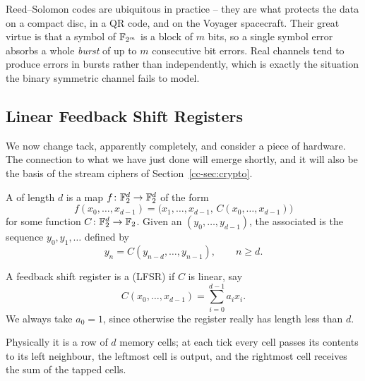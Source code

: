 \documentclass[a4paper]{scrartcl}
\begin{document}
\begin{remark}
	Reed--Solomon codes are ubiquitous in practice -- they are what protects the data on a compact disc, in a QR code, and on the Voyager spacecraft. Their great virtue is that a symbol of $\mathbb{F}_{2^m}$ is a block of $m$ bits, so a single symbol error absorbs a whole \emph{burst} of up to $m$ consecutive bit errors. Real channels tend to produce errors in bursts rather than independently, which is exactly the situation the binary symmetric channel fails to model.
\end{remark}

\subsection{Linear Feedback Shift Registers}

We now change tack, apparently completely, and consider a piece of hardware. The connection to what we have just done will emerge shortly, and it will also be the basis of the stream ciphers of Section~\ref{cc-sec:crypto}.

\begin{definition}
	A  of length $d$ is a map $f\colon\mathbb{F}_2^d\to\mathbb{F}_2^d$ of the form
	$$f(x_0,\dots,x_{d-1}) = \bigl(x_1,\dots,x_{d-1},\,C(x_0,\dots,x_{d-1})\bigr)$$
	for some function $C\colon\mathbb{F}_2^d\to\mathbb{F}_2$. Given an  $(y_0,\dots,y_{d-1})$, the associated  is the sequence $y_0,y_1,\dots$ defined by
	$$y_n = C(y_{n-d},\dots,y_{n-1}), \qquad n \ge d.$$
\end{definition}

\begin{definition}[LFSR]
	A feedback shift register is a  (LFSR) if $C$ is linear, say
	$$C(x_0,\dots,x_{d-1}) = \sum_{i=0}^{d-1}a_ix_i.$$
	We always take $a_0 = 1$, since otherwise the register really has length less than $d$.
\end{definition}

Physically it is a row of $d$ memory cells; at each tick every cell passes its contents to its left neighbour, the leftmost cell is output, and the rightmost cell receives the sum of the tapped cells.
\end{document}
